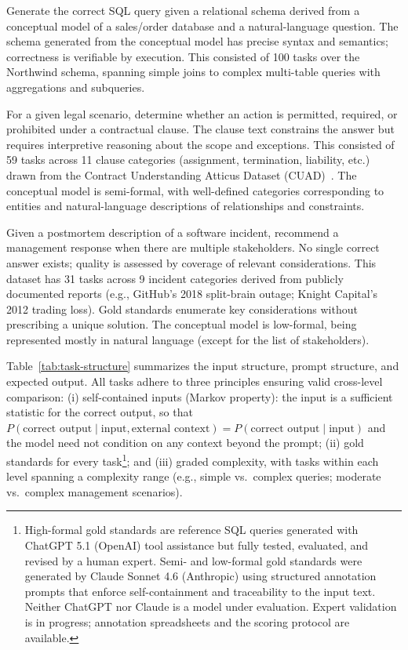 \documentclass[runningheads]{llncs}
\begin{document}
\begin{description}[style=nextline]
  \item[High-formal: SQL generation]
    Generate the correct SQL query given a relational schema derived from a conceptual model of a sales/order database and a natural-language question. The schema generated from the conceptual model has precise syntax and semantics; correctness is verifiable by execution. This consisted of 100 tasks over the Northwind schema, spanning simple joins to complex multi-table queries with aggregations and subqueries.

  \item[Semi-formal: Legal clause interpretation]
    For a given legal scenario, determine whether an action is permitted, required, or prohibited under a contractual clause. The clause text constrains the answer but requires interpretive reasoning about the scope and exceptions. This consisted of 59 tasks across 11 clause categories (assignment, termination, liability, etc.) drawn from the Contract Understanding Atticus Dataset (CUAD)~\cite{hendrycks2021cuad}.  The conceptual model is semi-formal, with well-defined categories corresponding to entities and natural-language descriptions of relationships and constraints.

  \item[Low-formal: Management decision-making]
    Given a postmortem description of a software incident, recommend a management response when there are multiple stakeholders. No single correct answer exists; quality is assessed by coverage of relevant considerations. This dataset has 31 tasks across 9 incident categories derived from publicly documented reports (e.g., GitHub's 2018 split-brain outage; Knight Capital's 2012 trading loss). Gold standards enumerate key considerations without prescribing a unique solution.  The conceptual model is low-formal, being represented mostly in natural language (except for the list of stakeholders).
\end{description}

\noindent Table~\ref{tab:task-structure} summarizes the input structure, prompt structure, and expected output. All tasks adhere to three principles ensuring valid cross-level comparison: (i) self-contained inputs (Markov property): the input is a sufficient statistic for the correct output, so that $P(\text{correct output} \mid \text{input}, \text{external context}) = P(\text{correct output} \mid \text{input})$ and the model need not condition on any context beyond the prompt; (ii) gold standards for every task\footnote{High-formal gold standards are reference SQL queries generated with ChatGPT 5.1 (OpenAI) tool assistance but fully tested, evaluated, and revised by a human expert. Semi- and low-formal gold standards were generated by Claude Sonnet 4.6 (Anthropic) using structured annotation prompts that enforce self-containment and traceability to the input text. Neither ChatGPT nor Claude is a model under evaluation. Expert validation is in progress; annotation spreadsheets and the scoring protocol are available.}; and (iii) graded complexity, with tasks within each level spanning a complexity range (e.g., simple vs.\ complex queries; moderate vs.\ complex management scenarios).
\end{document}
